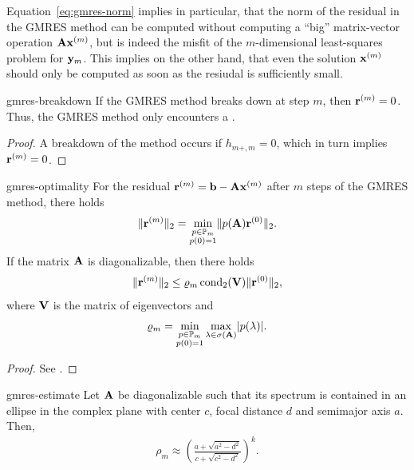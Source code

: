 \begin{remark}
  Equation~\eqref{eq:gmres-norm} implies in particular, that the norm
  of the residual in the GMRES method can be computed without
  computing a ``big'' matrix-vector operation $\mathbf A\mathbf x^{(m)}$, but is
  indeed the misfit of the $m$-dimensional least-squares problem for
  $\mathbf y_m$. This implies on the other hand, that even the solution
  $\mathbf x^{(m)}$ should only be computed as soon as the resiudal is
  sufficiently small.
\end{remark}

\begin{Lemma}{gmres-breakdown}
  If the GMRES method breaks down at step $m$, then
  $\mathbf r^{(m)}=0$. Thus, the GMRES method only encounters a
  .
\end{Lemma}

\begin{proof}
  A breakdown of the method occurs if $h_{m+,m} = 0$, which in turn
  implies $\mathbf r^{(m)} = 0$.
\end{proof}

\begin{Theorem}{gmres-optimality}
  For the residual $\mathbf r^{(m)} = \mathbf b-\mathbf A\mathbf x^{(m)}$ after $m$  steps of
  the GMRES method, there holds
  \begin{gather}
    \lVert\mathbf r^{(m)}\rVert_2 = \min_{\substack{p\in\mathbb P_m\\p(0) = 1}}
    \lVert p(\mathbf A)\mathbf r^{(0)}\rVert_2.
  \end{gather}
  If the matrix $\mathbf A$ is diagonalizable, then there holds
    \begin{gather}
    \lVert\mathbf r^{(m)}\rVert_2 \le \varrho_m \operatorname{cond}_2(\mathbf V) \lVert\mathbf r^{(0)}\rVert_2,
  \end{gather}
  where $\mathbf V$ is the matrix of eigenvectors and
  \begin{gather}
    \varrho_m = \min_{\substack{p\in\mathbb P_m\\p(0) = 1}} \max_{\lambda\in\sigma(\mathbf A)} \lvert p(\lambda)\rvert.
  \end{gather}
\end{Theorem}

\begin{proof}
  See \cite[Proposition 6.32]{Saad00}.
\end{proof}

\begin{Corollary}{gmres-estimate}
  Let $\mathbf A$ be diagonalizable such that its spectrum is contained in
  an ellipse in the complex plane with center $c$, focal distance $d$
  and semimajor axis $a$. Then,
  \begin{gather}
     \rho_m \approx \left(
      \frac{a+\sqrt{a^2-d^2}}{c+\sqrt{c^2-d^2}}
      \right)^k.
  \end{gather}
\end{Corollary}

